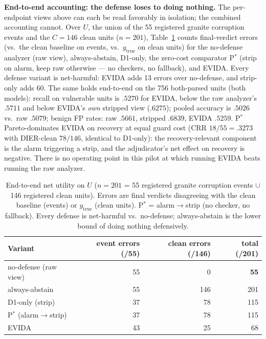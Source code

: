 \documentclass[sigconf,nonacm]{acmart}
\begin{document}
\textbf{End-to-end accounting: the defense loses to doing nothing.} The
per-endpoint views above can each be read favorably in isolation; the
combined accounting cannot. Over $U$, the union of the 55 registered
granite corruption events and the $C{=}146$ clean units ($n{=}201$),
Table~\ref{tab:netutil} counts final-verdict errors (vs.\ the clean
baseline on events, vs.\ $y_{\mathrm{true}}$ on clean units) for the
no-defense analyzer (raw view), always-abstain, D1-only, the zero-cost
comparator P$^{*}$ (strip on alarm, keep raw otherwise --- no checkers,
no fallback), and EVIDA. Every defense variant is net-harmful: EVIDA
adds 13 errors over no-defense, and strip-only adds 60. The same holds
end-to-end on the 756 both-parsed units (both models): recall on
vulnerable units is $.5270$ for EVIDA, below the raw analyzer's $.5711$
and below EVIDA's \emph{own} stripped view ($.6275$); pooled accuracy is
$.5026$ vs.\ raw $.5079$; benign FP rates: raw $.5661$, stripped
$.6839$, EVIDA $.5259$. P$^{*}$ Pareto-dominates EVIDA on recovery at
equal guard cost (CRR $18/55{=}.3273$ with DIER-clean $78/146$,
identical to D1-only): the recovery-relevant component is the alarm
triggering a strip, and the adjudicator's net effect on recovery is
negative. There is no operating point in this pilot at which running
EVIDA beats running the raw analyzer.

\begin{table}[t]
\centering\small
\caption{End-to-end net utility on $U$ ($n{=}201$ = 55 registered granite
corruption events $\cup$ 146 registered clean units). Errors are final
verdicts disagreeing with the clean baseline (events) or
$y_{\mathrm{true}}$ (clean units). P$^{*}$ = alarm$\to$strip (no
checker, no fallback). Every defense is net-harmful vs.\ no-defense;
always-abstain is the lower bound of doing nothing defensively.}
\label{tab:netutil}
\begin{tabular}{lrrr}
\toprule
Variant & event errors (/55) & clean errors (/146) & total (/201) \\
\midrule
no-defense (raw view) & 55 & 0 & \textbf{55} \\
always-abstain & 55 & 146 & 201 \\
D1-only (strip) & 37 & 78 & 115 \\
P$^{*}$ (alarm$\to$strip) & 37 & 78 & 115 \\
EVIDA & 43 & 25 & 68 \\
\bottomrule
\end{tabular}
\end{table}
\end{document}
